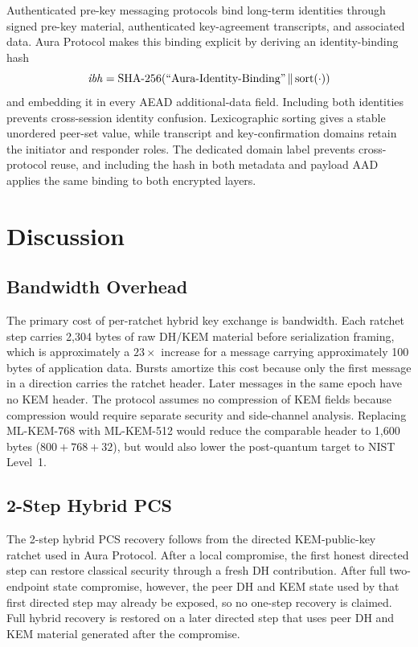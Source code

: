 \documentclass[preprint,12pt]{elsarticle}
\theoremstyle{definition}
\newcommand{\tech}[1]{\textnormal{#1}}
\newcommand{\domain}[1]{\textnormal{``#1''}}
\newcommand{\SHA}{\tech{SHA-256}}
\newcommand{\concat}{\,\|\,}
\begin{document}
Authenticated pre-key messaging protocols bind long-term identities through
signed pre-key material, authenticated key-agreement transcripts, and associated
data. Aura Protocol makes this binding explicit by deriving an identity-binding
hash
\[
  \mathit{ibh} =
    \SHA(\domain{Aura-Identity-Binding}\concat \mathrm{sort}(\cdot))
\]
and embedding it in every AEAD additional-data field. Including both identities
prevents cross-session identity confusion. Lexicographic sorting gives a stable
unordered peer-set value, while transcript and key-confirmation domains retain
the initiator and responder roles. The dedicated domain label prevents
cross-protocol reuse, and including the hash in both metadata and payload AAD
applies the same binding to both encrypted layers.


\section{Discussion}\label{sec:discussion}

\subsection{Bandwidth Overhead}

The primary cost of per-ratchet hybrid key exchange is bandwidth. Each ratchet
step carries 2{,}304 bytes of raw DH/KEM material before serialization framing,
which is approximately a $23\times$ increase
for a message carrying approximately 100 bytes of application data. Bursts
amortize this cost because only the first message in a direction carries the
ratchet header. Later messages in the same epoch have no KEM header. The
protocol assumes no compression of KEM fields because compression would require
separate security and side-channel analysis. Replacing ML-KEM-768 with
ML-KEM-512 would reduce the comparable header to 1{,}600 bytes
($800 + 768 + 32$), but would also lower the post-quantum target to NIST Level~1.

\subsection{2-Step Hybrid PCS}

The 2-step hybrid PCS recovery follows from the directed KEM-public-key ratchet used in Aura Protocol. After a local compromise, the first honest directed step can restore classical security through a fresh DH contribution. After full two-endpoint state compromise, however, the peer DH and KEM state used by that first directed step may already be exposed, so no one-step recovery is claimed. Full hybrid recovery is restored on a later directed step that uses peer DH and KEM material generated after the compromise.
\end{document}
